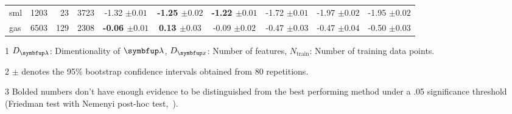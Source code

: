 \begin{table*}
\begin{threeparttable}
\begin{tabular}{lrrrcccccc}
    \textsf{sml} & 1203 & 23 & 3723 & {-1.32 {\scriptsize{\(\pm 0.01\)}}} & {\bf-1.25 {\scriptsize{\(\pm 0.02\)}}} & {\bf-1.22 {\scriptsize{\(\pm 0.01\)}}} & {-1.72 {\scriptsize{\(\pm 0.01\)}}} & {-1.97 {\scriptsize{\(\pm 0.02\)}}} & {-1.95 {\scriptsize{\(\pm 0.02\)}}} \\
    \textsf{gas} & 6503 & 129 & 2308 & {\bf-0.06 {\scriptsize{\(\pm 0.01\)}}} & {\bf 0.13 {\scriptsize{\(\pm 0.03\)}}} & {-0.09 {\scriptsize{\(\pm 0.02\)}}} & {-0.47 {\scriptsize{\(\pm 0.03\)}}} & {-0.47 {\scriptsize{\(\pm 0.04\)}}} & {-0.50 {\scriptsize{\(\pm 0.03\)}}}\\
    \bottomrule
 \end{tabular}
  \begin{tablenotes}
    \item[1] {\footnotesize \(D_{\vlambda}\): Dimentionality of \(\vlambda\), \(D_{\vx}\): Number of features, \(N_{\text{train}}\): Number of training data points.}
    \item[2] {\footnotesize \(\pm\) denotes the 95\% bootstrap confidence intervals obtained from 80 repetitions.}
    \item[3] {\footnotesize Bolded numbers don't have enough evidence to be distinguished from the best performing method under a .05 significance threshold (Friedman test with Nemenyi post-hoc test,~\citealt{JMLR:v7:demsar06a})}.
  \end{tablenotes}
  \end{threeparttable}
  \vspace{-0.1in}
\end{table*}

